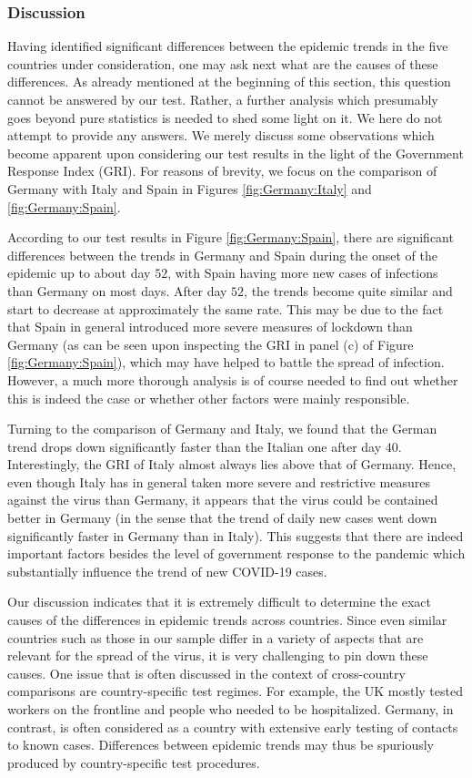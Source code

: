 \documentclass[a4paper,12pt]{article}
\numberwithin{equation}{section}
\begin{document}
\subsubsection{Discussion}


Having identified significant differences between the epidemic trends in the five countries under consideration, one may ask next what are the causes of these differences. As already mentioned at the beginning of this section, this question cannot be answered by our test. Rather, a further analysis which presumably goes beyond pure statistics is needed to shed some light on it. We here do not attempt to provide any answers. We merely discuss some observations which become apparent upon considering our test results in the light of the Government Response Index (GRI). For reasons of brevity, we focus on the comparison of Germany with Italy and Spain in Figures \ref{fig:Germany:Italy} and \ref{fig:Germany:Spain}. 


According to our test results in Figure \ref{fig:Germany:Spain}, there are significant differences between the trends in Germany and Spain during the onset of the epidemic up to about day $52$, with Spain having more new cases of infections than Germany on most days. After day $52$, the trends become quite similar and start to decrease at approximately the same rate. This may be due to the fact that Spain in general introduced more severe measures of lockdown than Germany (as can be seen upon inspecting the GRI in panel (c) of Figure \ref{fig:Germany:Spain}), which may have helped to battle the spread of infection. However, a much more thorough analysis is of course needed to find out whether this is indeed the case or whether other factors were mainly responsible. 


Turning to the comparison of Germany and Italy, we found that the German trend drops down significantly faster than the Italian one after day $40$. Interestingly, the GRI of Italy almost always lies above that of Germany. Hence, even though Italy has in general taken more severe and restrictive measures against the virus than Germany, it appears that the virus could be contained better in Germany (in the sense that the trend of daily new cases went down significantly faster in Germany than in Italy). This suggests that there are indeed important factors besides the level of government response to the pandemic which substantially influence the trend of new COVID-19 cases. 


Our discussion indicates that it is extremely difficult to determine the exact causes of the differences in epidemic trends across countries. Since even similar countries such as those in our sample differ in a variety of aspects that are relevant for the spread of the virus, it is very challenging to pin down these causes. One issue that is often discussed in the context of cross-country comparisons are country-specific test regimes. For example, the UK mostly tested workers on the frontline and people who needed to be hospitalized. Germany, in contrast, is often considered as a country with extensive early testing of contacts to known cases. Differences between epidemic trends may thus be spuriously produced by country-specific test procedures. 
\end{document}
